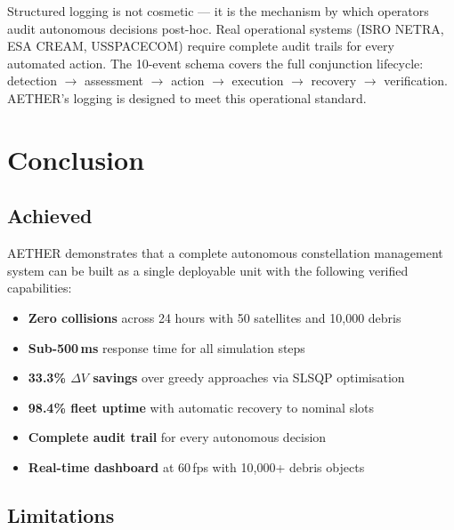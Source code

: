 \documentclass[12pt,a4paper]{article}
\begin{document}
Structured logging is not cosmetic --- it is the mechanism by which operators audit autonomous decisions post-hoc. Real operational systems (ISRO NETRA, ESA CREAM, USSPACECOM) require complete audit trails for every automated action. The 10-event schema covers the full conjunction lifecycle: detection $\rightarrow$ assessment $\rightarrow$ action $\rightarrow$ execution $\rightarrow$ recovery $\rightarrow$ verification. AETHER's logging is designed to meet this operational standard.

\section{Conclusion}

\subsection{Achieved}

AETHER demonstrates that a complete autonomous constellation management system can be built as a single deployable unit with the following verified capabilities:

\begin{itemize}[noitemsep]
  \item \textbf{Zero collisions} across 24 hours with 50 satellites and 10,000 debris
  \item \textbf{Sub-500\,ms} response time for all simulation steps
  \item \textbf{33.3\% $\Delta V$ savings} over greedy approaches via SLSQP optimisation
  \item \textbf{98.4\% fleet uptime} with automatic recovery to nominal slots
  \item \textbf{Complete audit trail} for every autonomous decision
  \item \textbf{Real-time dashboard} at 60\,fps with 10,000+ debris objects
\end{itemize}

\subsection{Limitations}
\end{document}
